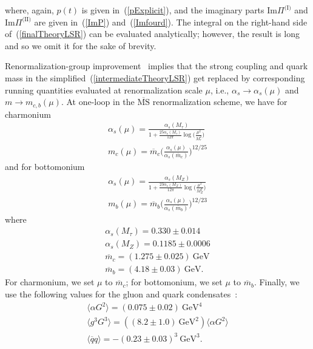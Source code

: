 \documentclass[11pt, letterpaper]{article}
\newcommand{\glueFourD}{\big\langle \alpha G^{2} \big\rangle}
\newcommand{\glueSixD}{\big\langle g^{3} G^{3} \big\rangle}
\begin{document}
%
where, again, $p(t)$ is given in~(\ref{pExplicit}), 
and the imaginary parts $\mathrm{Im}\Pi^{\text{(I)}}$ and 
$\mathrm{Im}\Pi^{\text{(II)}}$ are given
in~(\ref{ImP}) and~(\ref{Imfourd}).  
%
The integral on the right-hand side 
of~(\ref{finalTheoryLSR}) can be evaluated analytically; however, the result
is long and so we omit it for the sake of brevity.

Renormalization-group improvement~\cite{Narison:1981ts}
implies that the strong coupling and 
quark mass in the simplified~(\ref{intermediateTheoryLSR}) get replaced by 
corresponding running quantities evaluated at renormalization scale $\mu$, 
i.e., $\alpha_s\rightarrow\alpha_s(\mu)$ 
and $m\rightarrow m_{c,b}(\mu)$.
At one-loop in the $\overline{\text{MS}}$ renormalization scheme, we have
for charmonium
%
\begin{gather}
  \alpha_s(\mu) = \frac{\alpha_s(M_{\tau})}{1 + \frac{25 \alpha_s(M_{\tau})}%
  {12\pi}\log\!{\Big(\frac{\mu^2}{M_{\tau}^2}\Big)}}
  \\ 
  m_{c}(\mu) = \overline{m}_{c}\bigg(\frac{\alpha_s(\mu)}
  {\alpha_s(\overline{m}_{c})}\bigg)^{12/25}
\end{gather}
%
and for bottomonium
%
\begin{gather}
  \alpha_s(\mu) = \frac{\alpha_s(M_Z)}{1 + \frac{23 \alpha_s(M_Z)}%
  {12\pi}\log\!{\Big(\frac{\mu^2}{M_Z^2}\Big)}}
  \\ 
  m_{b}(\mu) = \overline{m}_{b}\bigg(\frac{\alpha_s(\mu)}
  {\alpha_s(\overline{m}_{b})}\bigg)^{12/23}
\end{gather}
where~\cite{Olive:2016xmw}
\begin{gather}
  \alpha_s(M_{\tau})=0.330\pm0.014\label{alphatau}\\
  \alpha_s(M_{Z})=0.1185\pm0.0006\label{alphaZ}\\
  \overline{m}_c=(1.275\pm0.025)\ \text{GeV}\label{charmMass}\\
  \overline{m}_b=(4.18\pm 0.03)\ \text{GeV}\label{bottomMass}.
\end{gather}
For charmonium, we set $\mu$ to $\overline{m}_c$;
for bottomonium, we set $\mu$ to $\overline{m}_b$.
Finally, we use the following values for the gluon and quark
condensates~\cite{Launer:1983ib,Narison2010,ChenKleivSteeleEtAl2013}:
\begin{gather}
  \glueFourD=(0.075\pm0.02)\ \text{GeV}^4\label{glueFourDValue}\\
  \glueSixD=((8.2\pm1.0)\ \text{GeV}^2)\label{glueSixDValue}\glueFourD\\
 \big\langle \overline{q}q \big\rangle = -(0.23 \pm 0.03)^3\ \text{GeV}^3\label{quarkThreeDValue}.
\end{gather}
\end{document}
